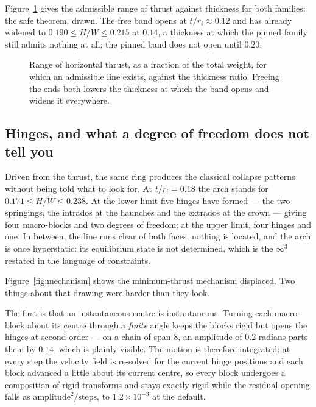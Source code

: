 \documentclass[final,3p,times,twocolumn]{elsarticle}
\begin{document}
Figure~\ref{fig:band} gives the admissible range of thrust against thickness
for both families: the safe theorem, drawn. The free band opens at
$t/r_i \approx 0.12$ and has already widened to $0.190 \le H/W \le 0.215$ at
$0.14$, a thickness at which the pinned family still admits nothing at all; the
pinned band does not open until $0.20$.

\begin{figure}[t]
\centering

\caption{Range of horizontal thrust, as a fraction of the total weight, for
  which an admissible line exists, against the thickness ratio. Freeing the
  ends both lowers the thickness at which the band opens and widens it
  everywhere.}
\label{fig:band}
\end{figure}

\subsection{Hinges, and what a degree of freedom does not tell you}
\label{sec:mechanism}

Driven from the thrust, the same ring produces the classical collapse patterns
without being told what to look for. At $t/r_i = 0.18$ the arch stands for
$0.171 \le H/W \le 0.238$. At the lower limit five hinges have formed --- the
two springings, the intrados at the haunches and the extrados at the crown ---
giving four macro-blocks and two degrees of freedom; at the upper limit, four
hinges and one. In between, the line runs clear of both faces, nothing is
located, and the arch is once hyperstatic: its equilibrium state is not
determined, which is the $\infty^3$ restated in the language of constraints.

Figure~\ref{fig:mechanism} shows the minimum-thrust mechanism displaced. Two
things about that drawing were harder than they look.

The first is that an instantaneous centre is instantaneous. Turning each
macro-block about its centre through a \emph{finite} angle keeps the blocks
rigid but opens the hinges at second order --- on a chain of span 8, an
amplitude of $0.2$ radians parts them by $0.14$, which is plainly visible. The
motion is therefore integrated: at every step the velocity field is re-solved
for the current hinge positions and each block advanced a little about its
current centre, so every block undergoes a composition of rigid transforms and
stays exactly rigid while the residual opening falls as
$\textrm{amplitude}^2/\textrm{steps}$, to $1.2\times10^{-3}$ at the default.
\end{document}

